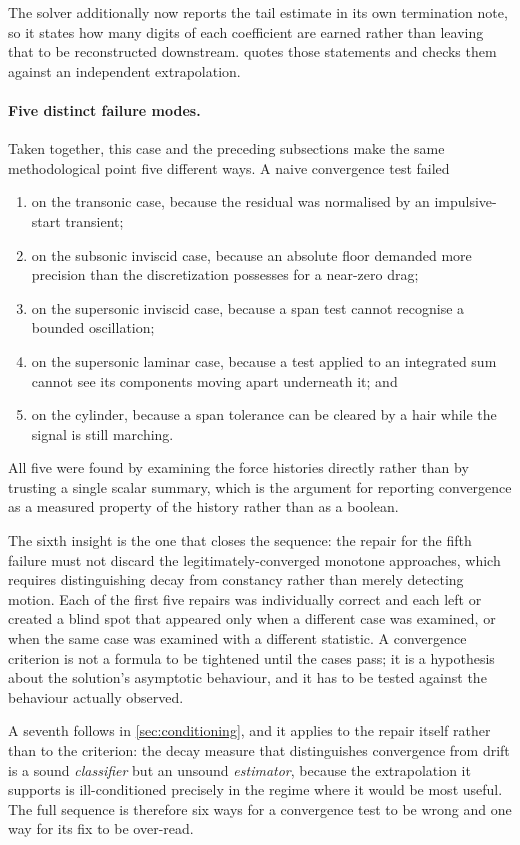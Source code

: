 The solver additionally now reports the tail estimate in its own termination note, so it
states how many digits of each coefficient are earned rather than leaving that to be
reconstructed downstream.  quotes those statements and checks them
against an independent extrapolation.

\paragraph{Five distinct failure modes.} Taken together, this case and the preceding
subsections make the same methodological point five different ways. A naive convergence
test failed
\begin{enumerate}
  \item on the transonic case, because the residual was normalised by an
  impulsive-start transient;
  \item on the subsonic inviscid case, because an absolute floor demanded more precision
  than the discretization possesses for a near-zero drag;
  \item on the supersonic inviscid case, because a span test cannot recognise a bounded
  oscillation;
  \item on the supersonic laminar case, because a test applied to an integrated sum
  cannot see its components moving apart underneath it; and
  \item on the cylinder, because a span tolerance can be cleared by a hair while the
  signal is still marching.
\end{enumerate}
All five were found by examining the force histories directly rather than by trusting a
single scalar summary, which is the argument for reporting convergence as a measured
property of the history rather than as a boolean.

The sixth insight is the one that closes the sequence: the repair for the fifth failure
must not discard the legitimately-converged monotone approaches, which requires
distinguishing decay from constancy rather than merely detecting motion. Each of the
first five repairs was individually correct and each left or created a blind spot that
appeared only when a different case was examined, or when the same case was examined
with a different statistic. A convergence criterion is not a formula to be tightened
until the cases pass; it is a hypothesis about the solution's asymptotic behaviour, and
it has to be tested against the behaviour actually observed.

A seventh follows in \cref{sec:conditioning}, and it applies to the repair itself rather
than to the criterion: the decay measure that distinguishes convergence from drift is a
sound \emph{classifier} but an unsound \emph{estimator}, because the extrapolation it
supports is ill-conditioned precisely in the regime where it would be most useful. The
full sequence is therefore six ways for a convergence test to be wrong and one way for
its fix to be over-read.

